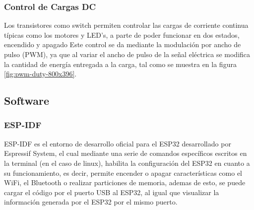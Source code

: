\subsubsection{Control de Cargas DC}

Los transistores como switch permiten controlar las cargas de corriente continua típicas como los motores y LED's, a parte de poder funcionar en dos estados, encendido y apagado Este control se da mediante la modulación por ancho de pulso (PWM), ya que al variar el ancho de pulso de la señal eléctrica se modifica la cantidad de energía entregada a la carga, tal como se muestra en la figura \ref{fig:pwm-duty-800x396}. \cite{PWM}


\subsection{Software}

\subsubsection{ESP-IDF}

ESP-IDF es el entorno de desarrollo oficial para el ESP32 desarrollado por Espressif System, el cual mediante una serie de comandos específicos escritos en la terminal (en el caso de linux), habilita la configuración del ESP32 en cuanto a su funcionamiento, es decir, permite encender o apagar características como el WiFi, el Bluetooth o realizar particiones de memoria, ademas de esto, se puede cargar el código por el puerto USB al ESP32, al igual que visualizar la información generada por el ESP32 por el mismo puerto. \cite{ES}